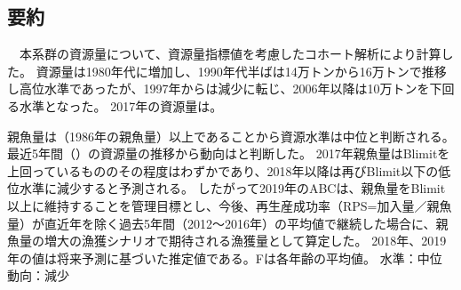 \subsection{要約}
　本系群の資源量について、資源量指標値を考慮したコホート解析により計算した。
資源量は1980年代に増加し、1990年代半ばは14万トンから16万トンで推移し高位水準であったが、1997年からは減少に転じ、2006年以降は10万トンを下回る水準となった。
2017年の資源量は\makeatletter{}。

親魚量は\makeatletter{}（1986年の親魚量\makeatletter{}\makeatother）以上であることから資源水準は{\StocktLevel}中位と判断される。
最近5年間（\makeatletter{}\makeatother {}）の資源量の推移から動向は{\StockTrend}と判断した。
2017年親魚量はBlimitを上回っているもののその程度はわずかであり、2018年以降は再びBlimit以下の低位水準に減少すると予測される。
したがって2019年のABCは、親魚量をBlimit以上に維持することを管理目標とし、今後、再生産成功率（RPS=加入量／親魚量）が直近年を除く過去5年間（2012～2016年）の平均値で継続した場合に、親魚量の増大の漁獲シナリオで期待される漁獲量として算定した。
2018年、2019年の値は将来予測に基づいた推定値である。Fは各年齢の平均値。
水準：中位　　動向：減少
